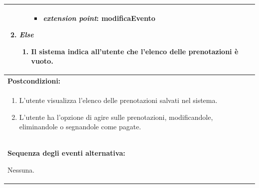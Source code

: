 \documentclass{article}
\begin{document}
\begin{table}[t]
\begin{tabular}{|p{\linewidth}|}
\begin{enumerate}
\begin{enumerate}
\begin{itemize}[noitemsep]
                                    \item[] \textit{extension point}: modificaEvento
                                \end{itemize}
                            \end{enumerate}
                            \item \textit{Else}
                            \begin{enumerate}
                                \item Il sistema indica all'utente che l'elenco delle prenotazioni è vuoto.
                            \end{enumerate}
                        \end{enumerate} \\
                        \hline
                        \cellcolor{gray!20}
                        \textbf{Postcondizioni:} \\
                        \cellcolor{gray!20}
                        \begin{minipage}{\linewidth}
                            \begin{enumerate}[noitemsep]
                                \item L'utente visualizza l'elenco delle prenotazioni salvati nel sistema.
                                \item L'utente ha l'opzione di agire sulle prenotazioni, modificandole, eliminandole o segnandole come pagate.
                            \end{enumerate}  
                        \end{minipage}
                        \vspace{0pt} \\
                        \hline
                        \textbf{Sequenza degli eventi alternativa:}
                        
                        Nessuna. \\
                        \hline
                    \end{tabular}
                \end{table}
\end{document}
